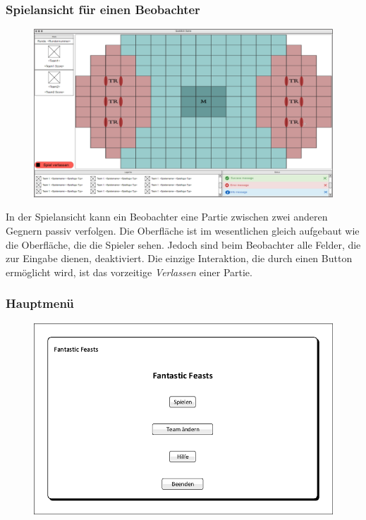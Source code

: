 \subsubsection{Spielansicht für einen Beobachter}

\begin{figure}[H]
    \centering
    \includegraphics[width=\textwidth]{images/InGameObserver.PNG}
\end{figure}

    In der Spielansicht kann ein Beobachter eine Partie zwischen zwei anderen Gegnern passiv verfolgen. Die Oberfläche ist im wesentlichen gleich aufgebaut wie die Oberfläche, die die Spieler sehen. Jedoch sind beim Beobachter alle Felder, die zur Eingabe dienen, deaktiviert. Die einzige Interaktion, die durch einen Button ermöglicht wird, ist das vorzeitige \textit{Verlassen} einer Partie.

    \subsubsection{Hauptmenü}
\begin{figure}[H]
    \centering
    \includegraphics[scale=0.8]{images/Startbildschirm.pdf}
\end{figure}

